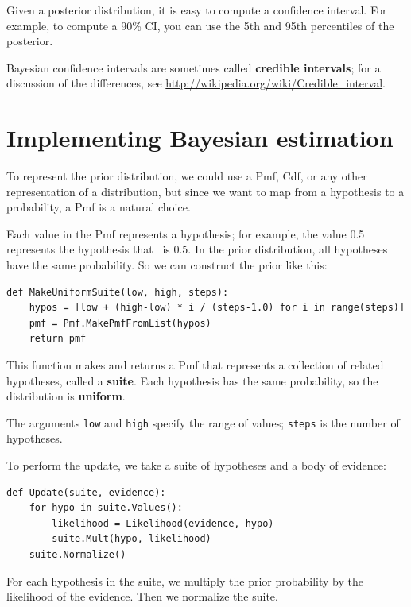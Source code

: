 \documentclass[12pt]{book}
\begin{document}
Given a posterior distribution, it is easy to compute a confidence
interval.  For example, to compute a 90\% CI, you can
use the 5th and 95th percentiles of the posterior.

Bayesian confidence intervals are sometimes called {\bf credible
intervals}; for a discussion of the differences, see
\url{http://wikipedia.org/wiki/Credible_interval}.


\section{Implementing Bayesian estimation}

To represent the prior distribution, we could use a Pmf, Cdf, or
any other representation of a distribution, but since we want to
map from a hypothesis to a probability, a Pmf is a natural choice.

Each value in the Pmf represents a hypothesis; for example, the
value 0.5 represents the hypothesis that \mylambda~is 0.5.
In the prior distribution, all hypotheses have the same probability.
So we can construct the prior like this:
%
\begin{verbatim}
def MakeUniformSuite(low, high, steps):
    hypos = [low + (high-low) * i / (steps-1.0) for i in range(steps)]
    pmf = Pmf.MakePmfFromList(hypos)
    return pmf
\end{verbatim}

This function makes and returns a Pmf that represents a 
collection of related hypotheses, called a {\bf suite}.  Each hypothesis
has the same probability, so the distribution is {\bf uniform}.

The arguments {\tt low} and {\tt high} specify the range of values;
{\tt steps} is the number of hypotheses.

To perform the update, we take a suite of hypotheses and a body of
evidence:
%
\begin{verbatim}
def Update(suite, evidence):
    for hypo in suite.Values():
        likelihood = Likelihood(evidence, hypo)
        suite.Mult(hypo, likelihood)
    suite.Normalize()
\end{verbatim}

For each hypothesis in the suite, we multiply the prior probability
by the likelihood of the evidence.  Then we normalize the suite.
\end{document}
